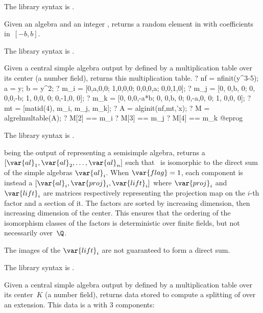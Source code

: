 The library syntax is .

\label{se:algrandom}
Given an algebra  and an integer , returns a random
element in  with coefficients in~$[-b,b]$.

The library syntax is .

\label{se:algrelmultable}
Given a central simple algebra  output by  defined by a multiplication table over its center (a number field), returns this multiplication table.
\bprog
? nf = nfinit(y^3-5); a = y; b = y^2;
? {m_i = [0,a,0,0;
          1,0,0,0;
          0,0,0,a;
          0,0,1,0];}
? {m_j = [0, 0,b, 0;
          0, 0,0,-b;
          1, 0,0, 0;
          0,-1,0, 0];}
? {m_k = [0, 0,0,-a*b;
          0, 0,b,   0;
          0,-a,0,   0;
          1, 0,0,   0];}
? mt = [matid(4), m_i, m_j, m_k];
? A = alginit(nf,mt,'x);
? M = algrelmultable(A);
? M[2] == m_i
? M[3] == m_j
? M[4] == m_k
@eprog

The library syntax is .

\label{se:algsimpledec}
 being the output of  representing a semisimple
algebra, returns a  $[\var{al}_1,\var{al}_2,\dots,\var{al}_n]$ such
that~ is isomorphic to the direct sum of the simple algebras
$\var{al}_i$. When $\var{flag}=1$, each component is instead a 
$[\var{al}_i,\var{proj}_i,\var{lift}_i]$ where $\var{proj}_i$
and~$\var{lift}_i$ are matrices respectively representing the projection map
on the $i$-th factor and a section of it. The factors are sorted by
increasing dimension, then increasing dimension of the center. This ensures
that the ordering of the isomorphism classes of the factors is deterministic
over finite fields, but not necessarily over~$\Q$.

 The images of the $\var{lift}_i$ are not guaranteed to form a direct sum.

The library syntax is .

\label{se:algsplittingdata}
Given a central simple algebra  output by  defined
by a multiplication table over its center~$K$ (a number field), returns data
stored to compute a splitting of  over an extension. This data is a
  with $3$ components:

